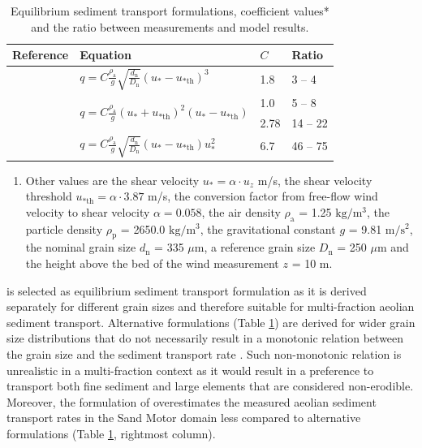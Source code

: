 \begin{table}
  \centering
  \caption{Equilibrium sediment transport formulations, coefficient
    values* and the ratio between measurements and model results.}
  \label{tab:models}
  \begin{tabular}{llll}
    Reference & Equation & $C$ & Ratio \\
    \hline
    \citet{Bagnold1937a} & $q = C \frac{\rho_{\mathrm{a}}}{g} \sqrt{\frac{d_{\mathrm{n}}}{D_{\mathrm{n}}}} \left(u_{\mathrm{*}} - u_{\mathrm{* th}} \right)^3$ & 1.8 & 3 -- 4 \\
    \citet{Horikawa1983} & \multirow{2}{*}{$q = C \frac{\rho_{\mathrm{a}}}{g} \left(u_{\mathrm{*}} + u_{\mathrm{* th}} \right)^2 \left(u_{\mathrm{*}} - u_{\mathrm{* th}} \right)$} & 1.0 & 5 -- 8 \\
    \citet{Kawamura1951} &  & 2.78 & 14 -- 22 \\
    \citet{Lettau1978} & $q = C \frac{\rho_{\mathrm{a}}}{g} \sqrt{\frac{d_{\mathrm{n}}}{D_{\mathrm{n}}}} \left(u_{\mathrm{*}} - u_{\mathrm{* th}} \right) u_{\mathrm{*}}^2$ & 6.7 & 46 -- 75 \\
  \end{tabular}

  \footnotesize{
    \begin{enumerate}[{*}]
    \item Other values are the shear velocity
      $u_{\mathrm{*}} = \alpha \cdot u_z$ m/s, the shear velocity
      threshold $u_{\mathrm{* th}} = \alpha \cdot 3.87$ m/s, the
      conversion factor from free-flow wind velocity to shear velocity
      $\alpha = 0.058$, the air density $\rho_{\mathrm{a}}$ = 1.25
      $\mathrm{kg/m^3}$, the particle density $\rho_{\mathrm{p}}$ =
      2650.0 $\mathrm{kg/m^3}$, the gravitational constant $g$ = 9.81
      $\mathrm{m/s^2}$, the nominal grain size $d_{\mathrm{n}}$ = 335
      $\mu \mathrm{m}$, a reference grain size $D_{\mathrm{n}}$ = 250
      $\mu \mathrm{m}$ and the height above the bed of the wind
      measurement $z$ = 10 m.
    \end{enumerate}
  }
\end{table}

\citet{Bagnold1937a} is selected as equilibrium sediment transport
formulation as it is derived separately for different grain sizes and
therefore suitable for multi-fraction aeolian sediment
transport. Alternative formulations (Table \ref{tab:models}) are
derived for wider grain size distributions that do not necessarily
result in a monotonic relation between the grain size and the sediment
transport rate \citep[e.g.][]{Kawamura1951, Horikawa1983}. Such
non-monotonic relation is unrealistic in a multi-fraction context as
it would result in a preference to transport both fine sediment and
large elements that are considered non-erodible. Moreover, the
formulation of \citet{Bagnold1937a} overestimates the measured aeolian
sediment transport rates in the Sand Motor domain less compared to
alternative formulations (Table \ref{tab:models}, rightmost column).

